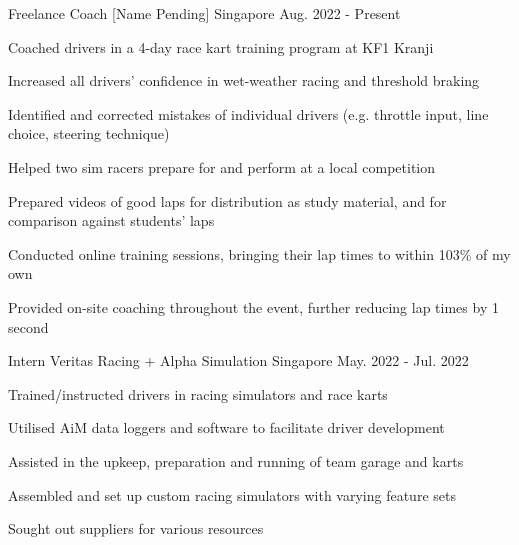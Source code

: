 

\begin{cventries}

  \cventry
    {Freelance Coach} %
    {[Name Pending]} %
    {Singapore} %
    {Aug. 2022 - Present} %
    {
      \begin{cvitems} %
        \item {Coached drivers in a 4-day race kart training program at KF1 Kranji}
        \begin{cvsubitems}
            \item {Increased all drivers' confidence in wet-weather racing and threshold braking}
            \item {Identified and corrected mistakes of individual drivers (e.g. throttle input, line choice, steering technique)}
        \end{cvsubitems}
        \item {Helped two sim racers prepare for and perform at a local competition}
        \begin{cvsubitems}
            \item {Prepared videos of good laps for distribution as study material, and for comparison against students' laps}
            \item {Conducted online training sessions, bringing their lap times to within 103\% of my own}
            \item {Provided on-site coaching throughout the event, further reducing lap times by 1 second}
        \end{cvsubitems}
      \end{cvitems}
    }

  \cventry
    {Intern} %
    {Veritas Racing + Alpha Simulation} %
    {Singapore} %
    {May. 2022 - Jul. 2022} %
    {
      \begin{cvitems} %
        \item {Trained/instructed drivers in racing simulators and race karts}
        \item {Utilised AiM data loggers and software to facilitate
        driver development}
        \item {Assisted in the upkeep, preparation and running of team garage and karts}
        \item {Assembled and set up custom racing simulators with varying feature sets}
        \item {Sought out suppliers for various resources}
      \end{cvitems}
    }


\end{cventries}
